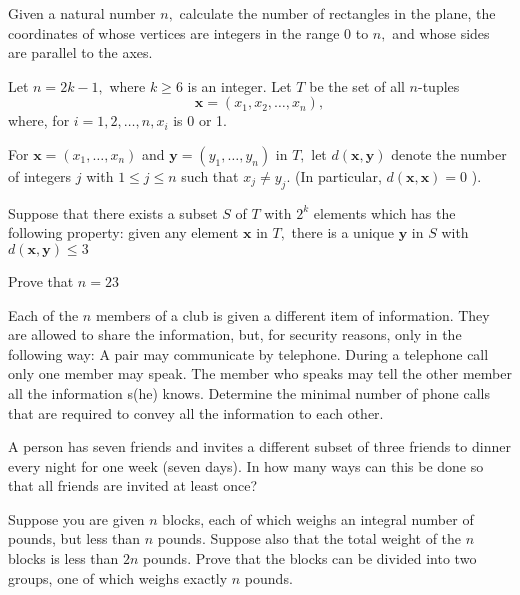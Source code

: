 \documentclass{pset}
\begin{document}
\begin{problems}
\begin{problem}[IrMO 1990 Q1]
    Given a natural number \(n,\) calculate the number of rectangles in the plane, the coordinates of whose vertices are integers in the range 0 to \(n,\) and whose sides are parallel to the axes.
\end{problem}

\begin{problem}[IrMO 1990 Q9]
    Let \(n=2 k-1,\) where \(k \geq 6\) is an integer. Let \(T\) be the set of all \(n\)-tuples $$\mathbf{x}=\left(x_{1}, x_{2}, \ldots, x_{n}\right),$$ where, for \(i=1,2, \ldots, n, x_{i}\) is 0 or 1.

    For \(\mathbf{x}=\left(x_{1}, \ldots, x_{n}\right)\) and \(\mathbf{y}=\left(y_{1}, \ldots, y_{n}\right)\) in \(T,\) let \(d(\mathbf{x}, \mathbf{y})\) denote the number of integers \(j\) with \(1 \leq j \leq n\) such that \(x_{j} \neq y_{j} .\) (In particular, \(d(\mathbf{x}, \mathbf{x})=0\) ). 
    
    Suppose that there exists a subset \(S\) of \(T\) with \(2^{k}\) elements which has the following property: given any element \(\mathbf{x}\) in \(T,\) there is a unique \(\mathbf{y}\) in \(S\) with \(d(\mathbf{x}, \mathbf{y}) \leq 3\) 
    
    Prove that \(n=23\)
\end{problem}

\begin{problem}[IrMO 1989 Q7]
    Each of the \(n\) members of a club is given a different item of information. They are allowed to share the information, but, for security reasons, only in the following way: A pair may communicate by telephone. During a telephone call only one member may speak. The member who speaks may tell the other member all the information s(he) knows. Determine the minimal number of phone calls that are required to convey all the information to each other.
\end{problem}

\begin{problem}[IrMO 1988 Q5]
    A person has seven friends and invites a different subset of three friends to dinner every night for one week (seven days). In how many ways can this be done so that all friends are invited at least once?
\end{problem}

\begin{problem}[IrMO 1988 Q6]
    Suppose you are given \(n\) blocks, each of which weighs an integral number of pounds, but less than \(n\) pounds. Suppose also that the total weight of the \(n\) blocks is less than \(2 n\) pounds. Prove that the blocks can be divided into two groups, one of which weighs exactly \(n\) pounds.
\end{problem}


\end{problems}
\end{document}
